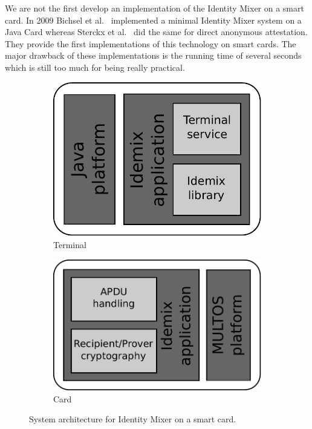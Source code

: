 We are not the first develop an implementation of the Identity Mixer on a smart
card. In 2009 Bichsel et al.~\cite{BichselCGS2009} implemented a minimal
Identity Mixer system on a Java Card whereas Sterckx et al.~\cite{Sterckx09}
did the same for direct anonymous attestation. They provide the first
implementations of this technology on smart cards. The major drawback of these
implementations is the running time of several seconds which is still too much
for being really practical.

\begin{figure}[ht]
  \centering
  \begin{subfigure}{0.45\textwidth}
    \includegraphics[scale=.45]{images/idemix-terminal-architecture}
    \caption{Terminal}
    \label{fig:terminal-architecture}
  \end{subfigure}
  \qquad
  \begin{subfigure}{0.45\textwidth}
    \includegraphics[scale=.45]{images/idemix-card-architecture}
    \caption{Card}
    \label{fig:card-architecture}
  \end{subfigure}
  \caption{System architecture for Identity Mixer on a smart card.}
  \label{fig:architecture}
\end{figure}

